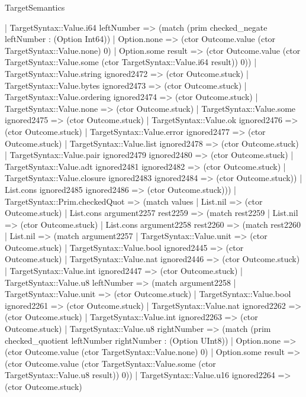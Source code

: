 \begin{lexlean}{TargetSemantics}
\begin{semanticmodule}
{          | TargetSyntax::Value.i64 leftNumber => (match (prim checked_negate leftNumber : (Option Int64))
            | Option.none => (ctor Outcome.value (ctor TargetSyntax::Value.none) 0)
            | Option.some result => (ctor Outcome.value (ctor TargetSyntax::Value.some (ctor TargetSyntax::Value.i64 result)) 0))
          | TargetSyntax::Value.string ignored2472 => (ctor Outcome.stuck)
          | TargetSyntax::Value.bytes ignored2473 => (ctor Outcome.stuck)
          | TargetSyntax::Value.ordering ignored2474 => (ctor Outcome.stuck)
          | TargetSyntax::Value.none => (ctor Outcome.stuck)
          | TargetSyntax::Value.some ignored2475 => (ctor Outcome.stuck)
          | TargetSyntax::Value.ok ignored2476 => (ctor Outcome.stuck)
          | TargetSyntax::Value.error ignored2477 => (ctor Outcome.stuck)
          | TargetSyntax::Value.list ignored2478 => (ctor Outcome.stuck)
          | TargetSyntax::Value.pair ignored2479 ignored2480 => (ctor Outcome.stuck)
          | TargetSyntax::Value.adt ignored2481 ignored2482 => (ctor Outcome.stuck)
          | TargetSyntax::Value.closure ignored2483 ignored2484 => (ctor Outcome.stuck))
        | List.cons ignored2485 ignored2486 => (ctor Outcome.stuck)))
    | TargetSyntax::Prim.checkedQuot => (match values
      | List.nil => (ctor Outcome.stuck)
      | List.cons argument2257 rest2259 => (match rest2259
        | List.nil => (ctor Outcome.stuck)
        | List.cons argument2258 rest2260 => (match rest2260
          | List.nil => (match argument2257
            | TargetSyntax::Value.unit => (ctor Outcome.stuck)
            | TargetSyntax::Value.bool ignored2445 => (ctor Outcome.stuck)
            | TargetSyntax::Value.nat ignored2446 => (ctor Outcome.stuck)
            | TargetSyntax::Value.int ignored2447 => (ctor Outcome.stuck)
            | TargetSyntax::Value.u8 leftNumber => (match argument2258
              | TargetSyntax::Value.unit => (ctor Outcome.stuck)
              | TargetSyntax::Value.bool ignored2261 => (ctor Outcome.stuck)
              | TargetSyntax::Value.nat ignored2262 => (ctor Outcome.stuck)
              | TargetSyntax::Value.int ignored2263 => (ctor Outcome.stuck)
              | TargetSyntax::Value.u8 rightNumber => (match (prim checked_quotient leftNumber rightNumber : (Option UInt8))
                | Option.none => (ctor Outcome.value (ctor TargetSyntax::Value.none) 0)
                | Option.some result => (ctor Outcome.value (ctor TargetSyntax::Value.some (ctor TargetSyntax::Value.u8 result)) 0))
              | TargetSyntax::Value.u16 ignored2264 => (ctor Outcome.stuck)
}
\end{semanticmodule}
\end{lexlean}
